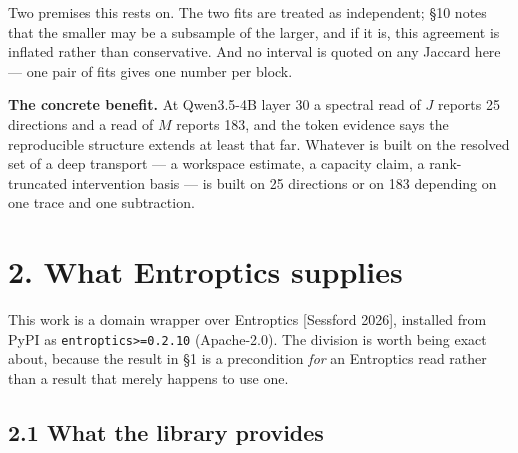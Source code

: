 \documentclass[10pt,letterpaper,twocolumn]{article}
\begin{document}
Two premises this rests on. The two fits are treated as independent; §10 notes that the smaller may
be a subsample of the larger, and if it is, this agreement is inflated rather than conservative.
And no interval is quoted on any Jaccard here --- one pair of fits gives one number per block.

\textbf{The concrete benefit.} At Qwen3.5-4B layer 30 a spectral read of \(J\) reports 25 directions and a
read of \(M\) reports 183, and the token evidence says the reproducible structure extends at least
that far. Whatever is built on the resolved set of a deep transport --- a workspace estimate, a
capacity claim, a rank-truncated intervention basis --- is built on 25 directions or on 183 depending
on one trace and one subtraction.

\section{2. What Entroptics supplies}\label{2-what-entroptics-supplies}

This work is a domain wrapper over Entroptics {[}Sessford 2026{]}, installed from PyPI as
\texttt{entroptics\textgreater{}\allowbreak{}=\allowbreak{}0.\allowbreak{}2.\allowbreak{}10} (Apache-2.0). The division is worth being exact about, because the result in §1
is a precondition \emph{for} an Entroptics read rather than a result that merely happens to use one.

\subsection{2.1 What the library provides}\label{21-what-the-library-provides}
\end{document}
